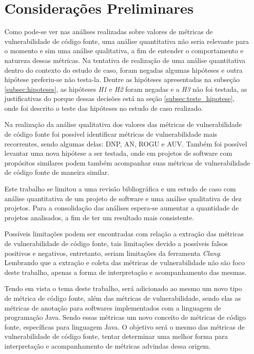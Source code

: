 \chapter{Considerações Preliminares} \label{chap:consideracoes}

Como pode-se ver nas análises realizadas sobre valores de métricas de
vulnerabilidade de código fonte, uma análise quantitativa não seria relevante
para o momento e sim uma análise qualitativa, a fim de entender o comportamento
e natureza dessas métricas. Na tentativa de realização de uma análise
quantitativa dentro do contexto do estudo de caso, foram negadas algumas
hipóteses e outra hipótese preferiu-se não testa-la. Dentre as hipóteses
apresentadas na subseção \ref{subsec:hipoteses}, as hipóteses \emph{H1} e \emph{H2}
foram negadas e a \emph{H3} não foi testada, as justificativas do porque dessas
decisões está na seção \ref{subsec:teste_hipotese}, onde foi descrito o teste
das hipóteses no estudo de caso realizado.

Na realização da análise qualitativa dos valores das métricas de vulnerabilidade
de código fonte foi possível identificar métricas de vulnerabilidade mais
recorrentes, sendo algumas delas: DNP, AN, ROGU e AUV. Também foi possível
levantar uma nova hipótese a ser testada, onde em projetos de software com
propósitos similares podem também acompanhar suas métricas de vulnerabilidade de
código fonte de maneira similar.

Este trabalho se limitou a uma revisão bibliográfica e um estudo de caso com análise 
quantitativa de um projeto de software e uma análise qualitativa de dez
projetos. Para a consolidação das análises espera-se aumentar a quantidade de
projetos analisados, a fim de ter um resultado mais consistente.

Possíveis limitações podem ser encontradas com relação a extração das métricas
de vulnerabilidade de código fonte, tais limitações devido a possíveis falsos
positivos e negativos, entretanto, seriam limitações da ferramenta \emph{Clang}.
Lembrando que a extração e coleta das métricas de vulnerabilidade não são foco
deste trabalho, apenas a forma de interpretação e acompanhamento das mesmas.

Tendo em vista o tema deste trabalho, será adicionado ao mesmo um novo tipo de
métrica de código fonte, além das métricas de vulnerabilidade, sendo elas as
métricas de anotação para softwares implementados com a linguagem de programação
Java. Sendo essas métricas um novo conceito de métricas de código fonte,
específicas para linguagem Java. O objetivo será o mesmo das métricas de
vulnerabilidade de código fonte, tentar determinar uma melhor forma para
interpretação e acompanhamento de métricas advindas dessa origem.

